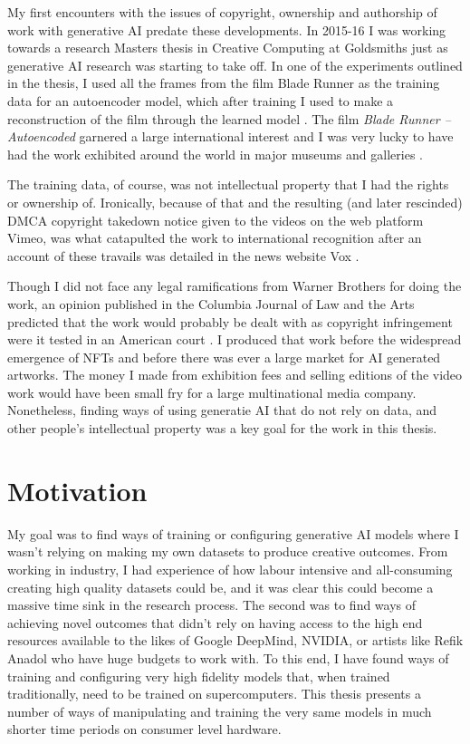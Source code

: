 My first encounters with the issues of copyright, ownership and authorship of work with generative AI predate these developments. 
In 2015-16 I was working towards a research Masters thesis in Creative Computing at Goldsmiths just as generative AI research was starting to take off. 
In one of the experiments outlined in the thesis, I used all the frames from the film Blade Runner as the training data for an autoencoder model, which after training I used to make a reconstruction of the film through the learned model \citep{broad2016autoencoding}.
The film \textit{Blade Runner -- Autoencoded} garnered a large international interest and I was very lucky to have had the work exhibited around the world in major museums and galleries \citep{broad2017autoencoding}.

The training data, of course, was not intellectual property that I had the rights or ownership of. 
Ironically, because of that and the resulting (and later rescinded) DMCA copyright takedown notice given to the videos on the web platform Vimeo, was what catapulted the work to international recognition after an account of these travails was detailed in the news website Vox \citep{romano2016bladerunner}.

Though I did not face any legal ramifications from Warner Brothers for doing the work, an opinion published in the Columbia Journal of Law and the Arts predicted that the work would probably be dealt with as copyright infringement were it tested in an American court \citep{sobel2017artificial}. 
I produced that work before the widespread emergence of NFTs and before there was ever a large market for AI generated artworks. 
The money I made from exhibition fees and selling editions of the video work would have been small fry for a large multinational media company. 
Nonetheless, finding ways of using generatie AI that do not rely on data, and other people's intellectual property was a key goal for the work in this thesis.

\section{Motivation}

My goal was to find ways of training or configuring generative AI models where I wasn’t relying on making my own datasets to produce creative outcomes. 
From working in industry, I had experience of how labour intensive and all-consuming creating high quality datasets could be, and it was clear this could become a massive time sink in the research process. 
The second was to find ways of achieving novel outcomes that didn’t rely on having access to the high end resources available to the likes of Google DeepMind, NVIDIA, or artists like Refik Anadol who have huge budgets to work with. 
To this end, I have found ways of training and configuring very high fidelity models that, when trained traditionally, need to be trained on supercomputers. 
This thesis presents a number of ways of manipulating and training the very same models in much shorter time periods on consumer level hardware. 

